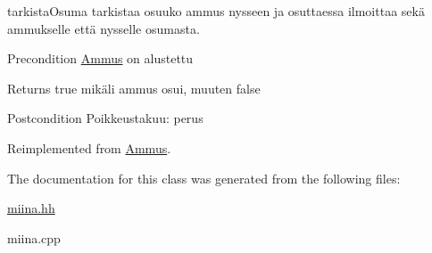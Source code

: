 tarkista\-Osuma tarkistaa osuuko ammus nysseen ja osuttaessa ilmoittaa sekä ammukselle että nysselle osumasta. 

\begin{DoxyPrecond}{Precondition}
\hyperlink{class_ammus}{Ammus} on alustettu 
\end{DoxyPrecond}
\begin{DoxyReturn}{Returns}
true mikäli ammus osui, muuten false 
\end{DoxyReturn}
\begin{DoxyPostcond}{Postcondition}
Poikkeustakuu\-: perus 
\end{DoxyPostcond}


Reimplemented from \hyperlink{class_ammus_a60d382b563f273bb90c60c4a5b396210}{Ammus}.



The documentation for this class was generated from the following files\-:\begin{DoxyCompactItemize}
\item 
\hyperlink{miina_8hh}{miina.\-hh}\item 
miina.\-cpp\end{DoxyCompactItemize}
